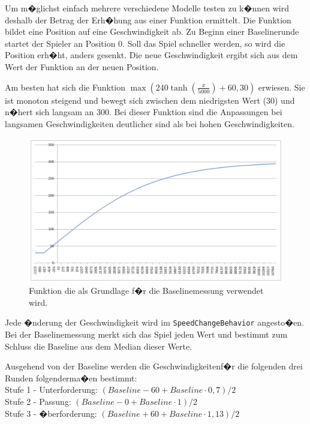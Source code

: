 \documentclass[a4paper,12pt]{scrartcl}
\newcommand*{\code}[1]{\texttt{#1}}%
\begin{document}
Um m�glichst einfach mehrere verschiedene Modelle testen zu k�nnen wird deshalb der
Betrag der Erh�hung aus einer Funktion ermittelt. Die Funktion bildet eine Position auf
eine Geschwindigkeit ab. Zu Beginn einer Baselinerunde startet der Spieler an Position
0. Soll das Spiel schneller werden, so wird die Position erh�ht, anders gesenkt. Die neue
Geschwindigkeit ergibt sich aus dem Wert der Funktion an der neuen Position.

Am besten hat sich die Funktion $\max(240 \tanh(\frac{x}{5000})+60,
30)$ erwiesen. Sie ist monoton steigend und bewegt sich zwischen dem niedrigsten
Wert (30) und n�hert sich langsam an 300. Bei dieser Funktion sind die Anpassungen 
bei langsamen Geschwindigkeiten deutlicher sind als bei hohen Geschwindigkeiten.

\begin{figure}[htp]
\begin{center}
  \includegraphics[width=1.0\textwidth]{BaselineFunktion.pdf}
  \caption[Grundlagenfunktion Baselinemessung]{Funktion die als Grundlage f�r
  die Baselinemessung verwendet wird.}
  \label{fig:BaselineFunktion}
\end{center}
\end{figure} 

Jede �nderung der Geschwindigkeit wird im \code{SpeedChangeBehavior} angesto�en. Bei der
Baselinemessung merkt sich das Spiel jeden Wert und bestimmt zum Schluss die Baseline
aus dem Median dieser Werte.

Ausgehend von der Baseline werden die Geschwindigkeitenf�r die folgenden drei Runden
folgenderma�en bestimmt:\\
Stufe 1 - Unterforderung: $(Baseline - 60 + Baseline\cdot0,7)/2$\\
Stufe 2 - Passung: $(Baseline - 0 + Baseline\cdot1)/2$\\
Stufe 3 - �berforderung: $(Baseline + 60 + Baseline\cdot1,13)/2$\\
\end{document}
